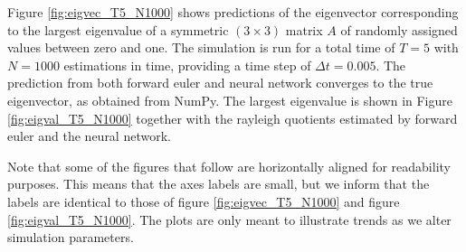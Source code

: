 \documentclass[12pt]{extarticle}
\begin{document}
Figure \ref{fig:eigvec_T5_N1000} shows predictions of the eigenvector corresponding to the largest eigenvalue of a symmetric $(3\times 3)$ matrix $A$ of randomly assigned values between zero and one. The simulation is run for a total time of $T=5$ with $N=1000$ estimations in time, providing a time step of $\Delta t = 0.005$. The prediction from both forward euler and neural network converges to the true eigenvector, as obtained from NumPy. The largest eigenvalue is shown in Figure \ref{fig:eigval_T5_N1000} together with the rayleigh quotients estimated by forward euler and the neural network.

Note that some of the figures that follow are horizontally aligned for readability purposes. This means that the axes labels are small, but we inform that the labels are identical to those of figure \ref{fig:eigvec_T5_N1000} and figure \ref{fig:eigval_T5_N1000}. The plots are only meant to illustrate trends as we alter simulation parameters. 
\end{document}
